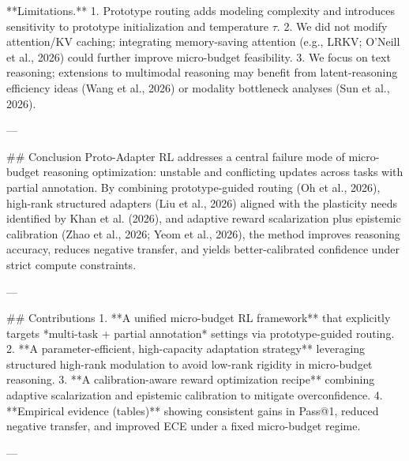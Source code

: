 **Limitations.**  
1. Prototype routing adds modeling complexity and introduces sensitivity to prototype initialization and temperature \(\tau\).  
2. We did not modify attention/KV caching; integrating memory-saving attention (e.g., LRKV; O’Neill et al., 2026) could further improve micro-budget feasibility.  
3. We focus on text reasoning; extensions to multimodal reasoning may benefit from latent-reasoning efficiency ideas (Wang et al., 2026) or modality bottleneck analyses (Sun et al., 2026).

---

## Conclusion  
Proto-Adapter RL addresses a central failure mode of micro-budget reasoning optimization: unstable and conflicting updates across tasks with partial annotation. By combining prototype-guided routing (Oh et al., 2026), high-rank structured adapters (Liu et al., 2026) aligned with the plasticity needs identified by Khan et al. (2026), and adaptive reward scalarization plus epistemic calibration (Zhao et al., 2026; Yeom et al., 2026), the method improves reasoning accuracy, reduces negative transfer, and yields better-calibrated confidence under strict compute constraints.

---

## Contributions  
1. **A unified micro-budget RL framework** that explicitly targets *multi-task + partial annotation* settings via prototype-guided routing.  
2. **A parameter-efficient, high-capacity adaptation strategy** leveraging structured high-rank modulation to avoid low-rank rigidity in micro-budget reasoning.  
3. **A calibration-aware reward optimization recipe** combining adaptive scalarization and epistemic calibration to mitigate overconfidence.  
4. **Empirical evidence (tables)** showing consistent gains in Pass@1, reduced negative transfer, and improved ECE under a fixed micro-budget regime.

---